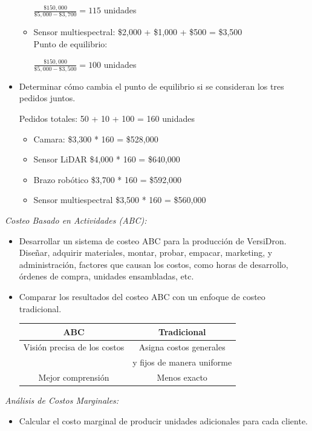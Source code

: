 \documentclass[letterpaper,12pt]{article}
\begin{document}
\begin{sloppypar}
\begin{itemize}
\begin{center}
\begin{itemize}
        $\displaystyle \frac{\$150,000}{\$5,000 - \$3,700} = 115$ unidades
        \item Sensor multiespectral:  \$2,000 + \$1,000 + \$500 = \$3,500 \\ Punto de equilibrio:
        
        $\displaystyle \frac{\$150,000}{\$5,000 - \$3,500} = 100$ unidades
    \end{itemize}
    \end{center} 
    \item Determinar cómo cambia el punto de equilibrio si se consideran los tres pedidos juntos. 
    \begin{center}
    Pedidos totales: 50 + 10 + 100 = 160 unidades
    \begin{itemize}
        \item Camara: \$3,300 * 160 = \$528,000
        \item Sensor LiDAR \$4,000 * 160 = \$640,000
        \item Brazo robótico \$3,700 * 160 = \$592,000
        \item Sensor multiespectral \$3,500 * 160 = \$560,000
    \end{itemize}
    \end{center}
\end{itemize}
\newpage
\textit{Costeo Basado en Actividades (ABC):}
\begin{itemize}
    \item Desarrollar un sistema de costeo ABC para la producción de VersiDron. \\  Diseñar, adquirir materiales, montar, probar, empacar, marketing, y administración, factores que causan los costos, como horas de desarrollo, órdenes de compra, unidades ensambladas, etc.
    \item Comparar los resultados del costeo ABC con un enfoque de costeo tradicional.
    \begin{center}
        \begin{tabular}[H]{|c|c|} \hline 
            ABC & Tradicional \\ \hline
            Visión precisa de los costos & Asigna costos generales\\ 
                & y fijos de manera uniforme\\ \hline
            Mejor comprensión & Menos exacto\\ \hline
        \end{tabular}
    \end{center}
\end{itemize}
\textit{Análisis de Costos Marginales:}
\begin{itemize}
    \item Calcular el costo marginal de producir unidades adicionales para cada
    cliente.
    \begin{center}


\end{center}
\end{itemize}
\end{sloppypar}
\end{document}
